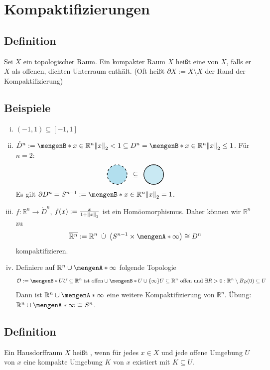 \section{Kompaktifizierungen} %
\label{sec:5}

\subsection[Definition: Kompaktifizierung]{Definition} %
\label{sub:51}
Sei $X$ ein topologischer Raum. Ein kompakter Raum $\overline{X}$ heißt eine  von $X$, falls er $X$ als offenen, dichten Unterraum enthält. 
(Oft heißt $\partial X := \overline{X} \setminus X $ der Rand der Kompaktifizierung)

\subsection[Beispiele für Kompaktifizierungen]{Beispiele} %
\label{sub:52}
\begin{enumerate}[(i)]
	\item $(-1,1) \subseteq [-1,1]$
	\item $\mathring D^n := \set[x \in \mathds{R}^n]{\norm[2]{x} < 1 } \subseteq D^n = \set[x \in \mathds{R}^n]{\norm[2]{x} \le 1 }  $. Für $n=2$:
	\[
		\vcenter{\hbox{\tikz{\draw[dashed, fill=LightBlue2, thick] (0,0) circle[radius=0.5];}}} \enspace\subseteq \enspace
		\vcenter{\hbox{\tikz{\draw[fill=LightBlue2!70, thick] (0,0) circle[radius=0.5];}}}
	\]
	Es gilt $\partial D^n = S^{n-1} := \set[x \in \mathds{R}^n]{\norm[2]{x} = 1 }$.
	\item $f : \mathds{R}^n \to \mathring D^n$, $f(x) := \frac{x}{1+ \norm[2]{x}} $ ist ein Homöomorphismus. Daher können wir $\mathds{R}^n$ zu
	\[
		\overline{\mathds{R}^n} := \mathds{R}^n \enspace\dot\cup \enspace \enbrace*{S^{n-1} \times \set{\infty}}  \cong D^n 
	\]
	kompaktifizieren.
	\item Definiere auf $\mathds{R}^n \cup \set{\infty}$ folgende Topologie 
	\[
		\mathcal{O} := \set[U]{U \subseteq \mathds{R}^n \text{ ist offen}} \cup \set[U \cup \{\infty\}]{U \subseteq \mathds{R}^n \text{ offen und } \exists R > 0 : 
		\mathds{R}^n \setminus B_R(0) \subseteq U} 
	\]
	Dann ist $\mathds{R}^n \cup \set{\infty}$ eine weitere Kompaktifizierung von $\mathds{R}^n$. Übung: $\mathds{R}^n \cup \set{\infty} \cong S^n$.
\end{enumerate}

\subsection[Definition: lokalkompakt]{Definition} %
\label{sub:53}
Ein Hausdorffraum $X$ heißt , wenn für jedes $x \in X$ und jede offene Umgebung $U$ von $x$ eine kompakte Umgebung $K$ von $x$ existiert mit 
$K \subseteq U$.

